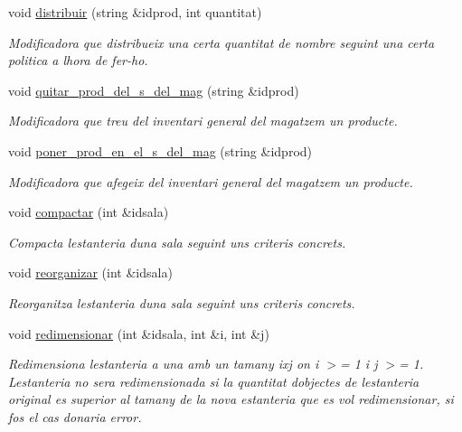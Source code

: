 \begin{DoxyCompactItemize}
void \hyperlink{class_magatzem_a15c31f32a673b7e3cf4443d03ace19a6}{distribuir} (string \&idprod, int quantitat)
\begin{DoxyCompactList}\small\item\em Modificadora que distribueix una certa quantitat de nombre seguint una certa politica a l\textquotesingle{}hora de fer-\/ho. \end{DoxyCompactList}\item 
void \hyperlink{class_magatzem_a98bf19f0ad6438d4a305bc9dc7a2670e}{quitar\+\_\+prod\+\_\+del\+\_\+s\+\_\+del\+\_\+mag} (string \&idprod)
\begin{DoxyCompactList}\small\item\em Modificadora que treu del inventari general del magatzem un producte. \end{DoxyCompactList}\item 
void \hyperlink{class_magatzem_ab8776250b582bb6b7b666e426d1820c1}{poner\+\_\+prod\+\_\+en\+\_\+el\+\_\+s\+\_\+del\+\_\+mag} (string \&idprod)
\begin{DoxyCompactList}\small\item\em Modificadora que afegeix del inventari general del magatzem un producte. \end{DoxyCompactList}\item 
void \hyperlink{class_magatzem_aeaebd6e73de2e965686264ecce7a0d26}{compactar} (int \&idsala)
\begin{DoxyCompactList}\small\item\em Compacta l\textquotesingle{}estanteria d\textquotesingle{}una sala seguint uns criteris concrets. \end{DoxyCompactList}\item 
void \hyperlink{class_magatzem_a101e50b85da7acf8bfc892c03321c14c}{reorganizar} (int \&idsala)
\begin{DoxyCompactList}\small\item\em Reorganitza l\textquotesingle{}estanteria d\textquotesingle{}una sala seguint uns criteris concrets. \end{DoxyCompactList}\item 
void \hyperlink{class_magatzem_adc1523fcbc1112437fdfe739fbeb393f}{redimensionar} (int \&idsala, int \&i, int \&j)
\begin{DoxyCompactList}\small\item\em Redimensiona l\textquotesingle{}estanteria a una amb un tamany ixj on i $>$= 1 i j $>$= 1. L\textquotesingle{}estanteria no sera redimensionada si la quantitat d\textquotesingle{}objectes de l\textquotesingle{}estanteria original es superior al tamany de la nova estanteria que es vol redimensionar, si fos el cas donaria error. \end{DoxyCompactList}\item 

\end{DoxyCompactItemize}

